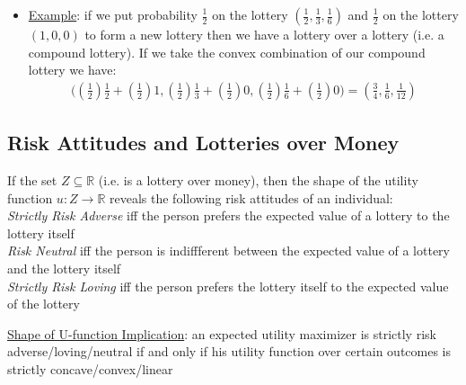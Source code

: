 \documentclass{article}
\begin{document}
  \begin{itemize}
    \item  \underline{Example}: if we put probability $\tfrac{1}{2}$ on the lottery $(\tfrac{1}{2}, \tfrac{1}{3}, \tfrac{1}{6})$ and $\tfrac{1}{2}$ on the lottery $(1,0,0)$ to form a new lottery then we have a lottery over a lottery (i.e. a compound lottery). If we take the convex combination of our compound lottery we have:
    \begin{gather*}
      \bigg((\frac{1}{2})\frac{1}{2} + (\frac{1}{2})1, (\frac{1}{2})\frac{1}{3} + (\frac{1}{2})0, (\frac{1}{2})\frac{1}{6} + (\frac{1}{2})0 \bigg) = (\frac{3}{4}, \frac{1}{6}, \frac{1}{12})
    \end{gather*}
  \end{itemize}
  \par
\vspace{6mm}
\subsection{Risk Attitudes and Lotteries over Money}
If the set $Z \subseteq \mathbb{R}$ (i.e. is a lottery over money), then the shape of the utility function $u: Z \rightarrow \mathbb{R}$ reveals the following risk attitudes of an individual: \\
\null\quad \textit{Strictly Risk Adverse} iff the person prefers the expected value of a lottery to the lottery itself \\
\null\quad \textit{Risk Neutral} iff the person is indiffferent between the expected value of a lottery and the lottery itself \\
\null\quad \textit{Strictly Risk Loving} iff the person prefers the lottery itself to the expected value of the lottery \par \vspace{0.3em}
  \underline{Shape of U-function Implication}: an expected utility maximizer is strictly risk adverse/loving/neutral if and only if his utility function over certain outcomes is strictly concave/convex/linear
\vspace{6mm}
\end{document}
